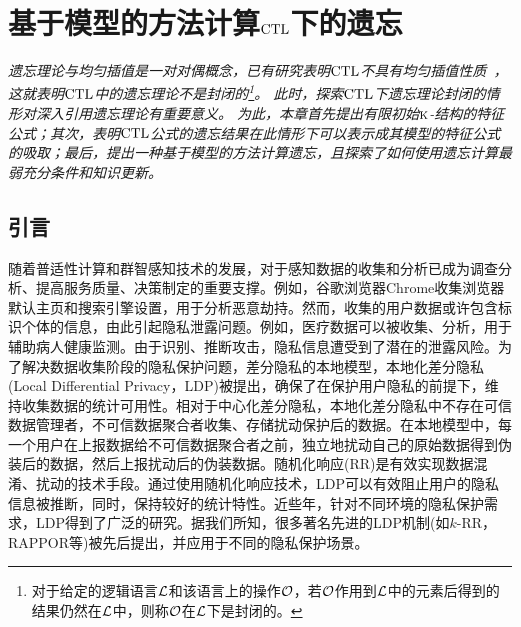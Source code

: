 \chapter{基于模型的方法计算$\textrm{CTL}$下的遗忘}\label{chapter05}

{\em
	遗忘理论与均匀插值是一对对偶概念，已有研究表明$\textrm{CTL}$不具有均匀插值性质~\cite{Maksimova:JANCL:1991}，这就表明$\textrm{CTL}$中的遗忘理论不是封闭的\footnote{对于给定的逻辑语言${\cal L}$和该语言上的操作${\cal O}$，若$\cal O$作用到$\cal L$中的元素后得到的结果仍然在$\cal L$中，则称$\cal O$在$\cal L$下是封闭的。}。
	此时，探索$\textrm{CTL}$下遗忘理论封闭的情形对深入引用遗忘理论有重要意义。
	为此，本章首先提出有限初始$\textsc{k}$-结构的特征公式；其次，表明$\textrm{CTL}$公式的遗忘结果在此情形下可以表示成其模型的特征公式的吸取；最后，提出一种基于模型的方法计算遗忘，且探索了如何使用遗忘计算最弱充分条件和知识更新。
}

\section{引言}\label{sec:chapter06_introduction}
随着普适性计算和群智感知技术的发展，对于感知数据的收集和分析已成为调查分析、提高服务质量、决策制定的重要支撑。例如，谷歌\cite{erlingsson2014rappor}浏览器Chrome收集浏览器默认主页和搜索引擎设置，用于分析恶意劫持。然而，收集的用户数据或许包含标识个体的信息，由此引起隐私泄露问题。例如，医疗数据可以被收集、分析，用于辅助病人健康监测。由于识别、推断攻击，隐私信息遭受到了潜在的泄露风险。为了解决数据收集阶段的隐私保护问题，差分隐私\cite{dwork2006differential,dwork2006calibrating,dwork2014algorithmic}的本地模型，本地化差分隐私(Local Differential Privacy，LDP)\cite{duchi2013local}被提出，确保了在保护用户隐私的前提下，维持收集数据的统计可用性。相对于中心化差分隐私，本地化差分隐私中不存在可信数据管理者，不可信数据聚合者收集、存储扰动保护后的数据。在本地模型中，每一个用户在上报数据给不可信数据聚合者之前，独立地扰动自己的原始数据得到伪装后的数据，然后上报扰动后的伪装数据。随机化响应(RR)是有效实现数据混淆、扰动的技术手段。通过使用随机化响应技术，LDP可以有效阻止用户的隐私信息被推断，同时，保持较好的统计特性。近些年，针对不同环境的隐私保护需求，LDP得到了广泛的研究\cite{wang2019collecting,gu2020providing,murakami2019utility}。据我们所知，很多著名先进的LDP机制(如$k$-RR\cite{kairouz2016extremal}，RAPPOR\cite{fanti2016building,erlingsson2014rappor}等)被先后提出，并应用于不同的隐私保护场景。


